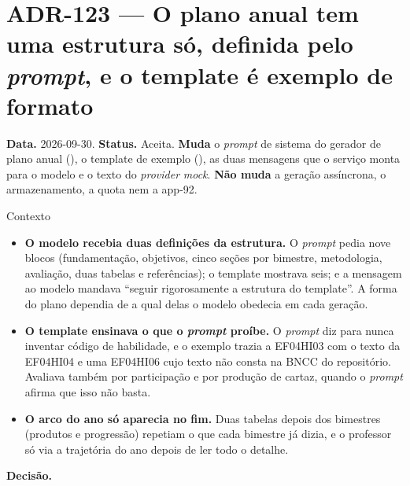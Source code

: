 \section{ADR-123 --- O plano anual tem uma estrutura só, definida pelo \emph{prompt}, e o template é exemplo de formato}
\label{adr:plano-estrutura}

\textbf{Data.} 2026-09-30. \textbf{Status.} Aceita.
\textbf{Muda} o \emph{prompt} de sistema do gerador de plano anual
(), o template de exemplo
(), as duas mensagens que o serviço monta para o
modelo e o texto do \emph{provider} \emph{mock}. \textbf{Não muda} a geração
assíncrona, o armazenamento, a quota nem a app-92.

\begin{especificacao}{Contexto}
\begin{itemize}
  \item \textbf{O modelo recebia duas definições da estrutura.} O \emph{prompt}
    pedia nove blocos (fundamentação, objetivos, cinco seções por bimestre,
    metodologia, avaliação, duas tabelas e referências); o template mostrava
    seis; e a mensagem ao modelo mandava \enquote{seguir rigorosamente a
    estrutura do template}. A forma do plano dependia de a qual delas o modelo
    obedecia em cada geração.
  \item \textbf{O template ensinava o que o \emph{prompt} proíbe.} O \emph{prompt}
    diz para nunca inventar código de habilidade, e o exemplo trazia a EF04HI03
    com o texto da EF04HI04 e uma EF04HI06 cujo texto não consta na BNCC do
    repositório. Avaliava também por participação e por produção de cartaz,
    quando o \emph{prompt} afirma que isso não basta.
  \item \textbf{O arco do ano só aparecia no fim.} Duas tabelas depois dos
    bimestres (produtos e progressão) repetiam o que cada bimestre já dizia, e o
    professor só via a trajetória do ano depois de ler todo o detalhe.
\end{itemize}
\end{especificacao}

\textbf{Decisão.}

